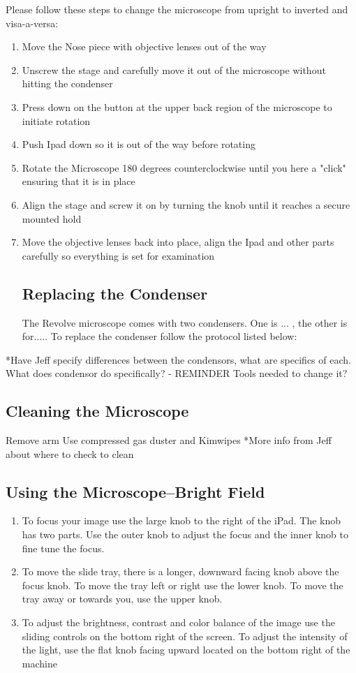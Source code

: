 \documentclass{article}
\begin{document}
Please follow these steps to change the microscope from upright to inverted and visa-a-versa:
\begin{enumerate}
  \item Move the Nose piece with objective lenses out of the way
  \item Unscrew the stage and carefully move it out of the microscope without hitting the condenser 
  \item Press down on the button at the upper back region of the microscope to initiate rotation 
  \item Push Ipad down so it is out of the way before rotating
  \item Rotate the Microscope 180 degrees counterclockwise until you here a "click" ensuring that it is in place
  \item Align the stage and screw it on by turning the knob until it reaches a secure mounted hold
  \item Move the objective lenses back into place, align the Ipad and other parts carefully so everything is set for examination 
  
  \subsection{Replacing the Condenser}
  The Revolve microscope comes with two condensers. One is ... , the other is for..... To replace the condenser follow the protocol listed below: 
\end{enumerate}

*Have Jeff specify differences between the condensors, what are specifics of each.
What does condensor do specifically? - REMINDER
Tools needed to change it?

\subsection {Cleaning the Microscope}

Remove arm
Use compressed gas duster and Kimwipes
*More info from Jeff about where to check to clean
  
  
\subsection{Using the Microscope--Bright Field} 

\begin{enumerate}
  \item To focus your image use the large knob to the right of the iPad. The knob has two parts. Use the outer knob to adjust the focus and the inner knob to fine tune the focus.
  \item To move the slide tray, there is a longer, downward facing knob above the focus knob. To move the tray left or right use the lower knob. To move the tray away or towards you, use the upper knob.
  \item To adjust the brightness, contrast and color balance of the image use the sliding controls on the bottom right of the screen. To adjust the intensity of the light, use the flat knob facing upward located on the bottom right of the machine
  
\end{enumerate}
\end{document}
